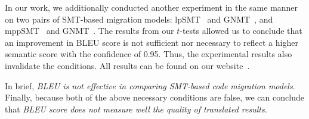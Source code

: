 %
%



In our work, we additionally conducted another experiment in the same
manner on two pairs of SMT-based migration models: lpSMT~\cite{fse13}
and GNMT~\cite{gnmt}, and mppSMT~\cite{ase15} and
GNMT~\cite{gnmt}. The results from our $t$-tests allowed us to
conclude that an improvement in BLEU score is not sufficient nor
necessary to reflect a higher semantic score with the confidence of
0.95. Thus, the experimental results also invalidate the conditions. All
results can be found on our website~\cite{ruby-website}.

In brief, {\em BLEU is not effective in comparing SMT-based code
  migration models}. Finally, because both of the above necessary
conditions are false, we can conclude that {\em BLEU score does not
  measure well the quality of translated results}.

